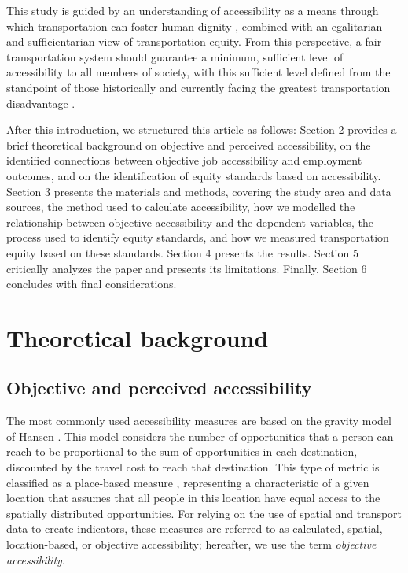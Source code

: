 \documentclass[preprint, 3p,
authoryear]{elsarticle} %
\begin{document}
This study is guided by an understanding of accessibility as a means
through which transportation can foster human dignity
\citep{pereira2021, dossantos}, combined with an egalitarian and
sufficientarian view of transportation equity. From this perspective, a
fair transportation system should guarantee a minimum, sufficient level
of accessibility to all members of society, with this sufficient level
defined from the standpoint of those historically and currently facing
the greatest transportation disadvantage \citep{martens2021}.

After this introduction, we structured this article as follows: Section
2 provides a brief theoretical background on objective and perceived
accessibility, on the identified connections between objective job
accessibility and employment outcomes, and on the identification of
equity standards based on accessibility. Section 3 presents the
materials and methods, covering the study area and data sources, the
method used to calculate accessibility, how we modelled the relationship
between objective accessibility and the dependent variables, the process
used to identify equity standards, and how we measured transportation
equity based on these standards. Section 4 presents the results. Section
5 critically analyzes the paper and presents its limitations. Finally,
Section 6 concludes with final considerations.

\section{Theoretical background}\label{theoretical-background}

\subsection{Objective and perceived
accessibility}\label{objective-and-perceived-accessibility}

The most commonly used accessibility measures are based on the gravity
model of Hansen \citeyearpar{hansen1959}. This model considers the
number of opportunities that a person can reach to be proportional to
the sum of opportunities in each destination, discounted by the travel
cost to reach that destination. This type of metric is classified as a
place-based measure \citep{pereira2023}, representing a characteristic
of a given location that assumes that all people in this location have
equal access to the spatially distributed opportunities. For relying on
the use of spatial and transport data to create indicators, these
measures are referred to as calculated, spatial, location-based, or
objective accessibility; hereafter, we use the term \emph{objective
accessibility}.
\end{document}

